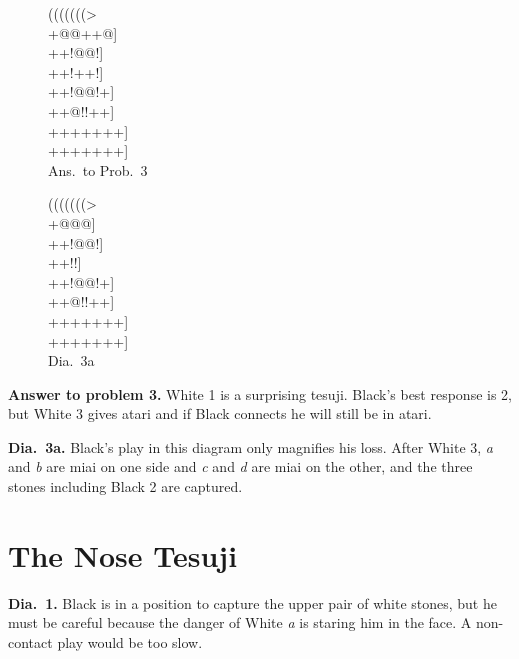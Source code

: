 \documentclass[mcrownvopaper,10pt,twopage,onecolumn,final]{memoir}
\begin{document}
\begin{figure}[ht]
    \begin{minipage}[c]{0.50\linewidth}
        \centering    
        {\gnos%
        (((((((>\\
        +@@+{\gnosb{}}+@]\\
        ++!@{\gnosw{}}@!]\\
        ++!+{\gnosw{}}+!]\\
        ++!@@!+]\\
        ++@!!++]\\
        +++++++]\\
        +++++++]\\
        }
        Ans.\ to Prob.\ 3
    \end{minipage}%
    \begin{minipage}[c]{0.50\linewidth}
        \centering    
        {\gnos%
        (((((((>\\
        +@@@]\\
        ++!@{\gnosw{}}@!]\\
        ++!!]\\
        ++!@@!+]\\
        ++@!!++]\\
        +++++++]\\
        +++++++]\\
        }
        Dia.\ 3a
    \end{minipage}
\end{figure}

\noindent
\textbf{Answer to problem 3.} White 1 is a surprising tesuji. Black's best
response is 2, but White 3 gives atari and if Black connects he will still
be in atari.

\noindent
\textbf{Dia.\ 3a.} Black's play in this diagram only magnifies his loss. After
White 3, \textit{a} and \textit{b} are miai on one side and \textit{c} and \textit{d} are miai on the other,
and the three stones including Black 2 are captured.

\section{The Nose Tesuji}

\textbf{Dia.\ 1.} Black is in a position to capture the upper pair of white stones,
but he must be careful because the danger of White \textit{a} is staring him in
the face. A non-contact play would be too slow.
\end{document}
